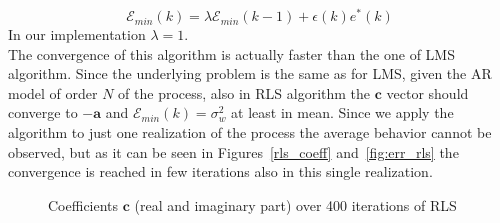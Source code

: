 \documentclass[10pt]{article}
\numberwithin{equation}{section}
\begin{document}
\begin{equation}
  \mathcal{E}_{min}(k) = \lambda \mathcal{E}_{min}(k-1) + \epsilon(k)e^*(k)
\end{equation}
In our implementation $\lambda = 1$. \\
The convergence of this algorithm is actually faster than the one of LMS algorithm. Since the underlying problem is the same as for LMS, given the AR model of order $N$ of the process, also in RLS algorithm the $\mathbf{c}$ vector should converge to $-\mathbf{a}$ and $\mathcal{E}_{min}(k) = \sigma_w^2$ at least in mean. Since we apply the algorithm to just one realization of the process the average behavior cannot be observed, but as it can be seen in Figures~\ref{rls_coeff} and~\ref{fig:err_rls} the convergence is reached in few iterations also in this single realization.

\begin{figure}[h!]
\centering
	
  \caption{Coefficients $\mathbf{c}$ (real and imaginary part) over 400 iterations of RLS}
  \label{fig:coeff_rls}
\end{figure}
\end{document}
